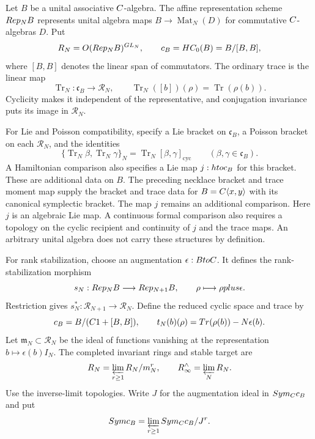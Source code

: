 Let $B$ be a unital associative $\C$-algebra.
The affine representation scheme $\Rep_NB$ represents unital algebra maps
$B\to\operatorname{Mat}_N(D)$ for commutative $\C$-algebras $D$.
Put
\[
 \mathcal R_N=\Ocal(\Rep_NB)^{GL_N},\qquad
 \mathfrak c_B=HC_0(B)=B/[B,B],
\]
where $[B,B]$ denotes the linear span of commutators.
The ordinary trace is the linear map
\[
 \operatorname{Tr}_N:\mathfrak c_B\longrightarrow\mathcal R_N,
 \qquad
 \operatorname{Tr}_N([b])(\rho)=\operatorname{Tr}(\rho(b)).
\]
Cyclicity makes it independent of the representative, and conjugation
invariance puts its image in $\mathcal R_N$.

For Lie and Poisson compatibility, specify a Lie bracket on $\mathfrak c_B$,
a Poisson bracket on each $\mathcal R_N$, and the identities
\begin{equation}\label{eq:vol2-trace-bracket-datum}
 \{\operatorname{Tr}_N\beta,\operatorname{Tr}_N\gamma\}_N
 =\operatorname{Tr}_N[\beta,\gamma]_{\mathrm{cyc}}
 \qquad(\beta,\gamma\in\mathfrak c_B).
\end{equation}
A Hamiltonian comparison also specifies a Lie map
$j:\h\to\mathfrak c_B$ for this bracket.
These are additional data on $B$.
The preceding necklace bracket and trace moment map supply the bracket
and trace data for $B=\C\angles{x,y}$ with its canonical symplectic bracket.
The map $j$ remains an additional comparison.
Here $j$ is an algebraic Lie map.  A continuous formal comparison
also requires a topology on the cyclic recipient and continuity of
$j$ and the trace maps.
An arbitrary unital algebra does not carry these structures by definition.

For rank stabilization, choose an augmentation $\epsilon:B\to\C$.
It defines the rank-stabilization morphism
\[
 s_N:\Rep_NB\longrightarrow\Rep_{N+1}B,
 \qquad \rho\longmapsto\rho\oplus\epsilon.
\]
Restriction gives $s_N^*:\mathcal R_{N+1}\to\mathcal R_N$.
Define the reduced cyclic space and trace by
\[
 \overline{\mathfrak c}_B=B/(\C1+[B,B]),
 \qquad
 t_N(\overline b)(\rho)
 =\operatorname{Tr}(\rho(b))-N\epsilon(b).
\]
Let $\mathfrak m_N\subset\mathcal R_N$ be the ideal of functions
vanishing at the representation $b\mapsto\epsilon(b)I_N$.
The completed invariant rings and stable target are
\[
 \widehat{\mathcal R}_N
 =\varprojlim_{r\ge1}\mathcal R_N/\mathfrak m_N^r,
 \qquad
 \mathcal R_\infty^{\wedge}
 =\varprojlim_N\widehat{\mathcal R}_N.
\]
Use the inverse-limit topologies.
Write $J$ for the augmentation ideal in $\Sym_\C\overline{\mathfrak c}_B$
and put
\[
 \widehat\Sym\overline{\mathfrak c}_B
 =\varprojlim_{r\ge1}
   \Sym_\C\overline{\mathfrak c}_B/J^r.
\]

